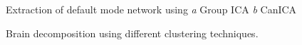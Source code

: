 \documentclass{frontiersSCNS} %
\begin{document}
\begin{figure}[h]
  \begin{center}
  \end{center}
  \caption{Extraction of default mode network using \textit{a} Group ICA
  \textit{b} CanICA}
  \label{fig:ica}
\end{figure}

\begin{figure}[h]
  \begin{center}
  \end{center}
  \caption{Brain decomposition using different clustering techniques.}
  \label{fig:clustering}
\end{figure}
\end{document}
